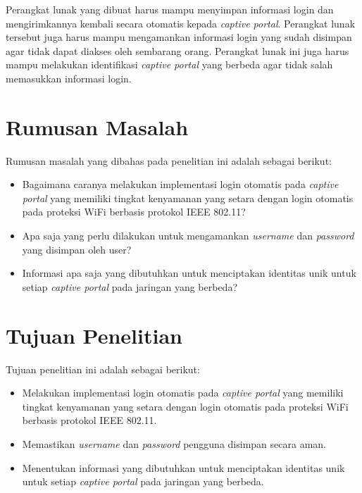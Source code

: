 Perangkat lunak yang dibuat harus mampu menyimpan informasi login dan mengirimkannya kembali secara otomatis kepada \textit{captive portal}. Perangkat lunak tersebut juga harus mampu mengamankan informasi login yang sudah disimpan agar tidak dapat diakses oleh sembarang orang. Perangkat lunak ini juga harus mampu melakukan identifikasi \textit{captive portal} yang berbeda agar tidak salah memasukkan informasi login.



\section{Rumusan Masalah}
\label{sec:rumusan_masalah}

Rumusan masalah yang dibahas pada penelitian ini adalah sebagai berikut:

\begin{itemize}
	\item{Bagaimana caranya melakukan implementasi login otomatis pada \textit{captive portal} yang memiliki tingkat kenyamanan yang setara dengan login otomatis pada proteksi WiFi berbasis protokol IEEE 802.11?}
	\item{Apa saja yang perlu dilakukan untuk mengamankan \textit{username} dan \textit{password} yang disimpan oleh user?}
	\item{Informasi apa saja yang dibutuhkan untuk menciptakan identitas unik untuk setiap \textit{captive portal} pada jaringan yang berbeda?}
\end{itemize}



\section{Tujuan Penelitian}
\label{sec:tujuan_penelitian}

Tujuan penelitian ini adalah sebagai berikut:

\begin{itemize}
	\item{Melakukan implementasi login otomatis pada \textit{captive portal} yang memiliki tingkat kenyamanan yang setara dengan login otomatis pada proteksi WiFi berbasis protokol IEEE 802.11.}
	\item{Memastikan \textit{username} dan \textit{password} pengguna disimpan secara aman.}
	\item{Menentukan informasi yang dibutuhkan untuk menciptakan identitas unik untuk setiap \textit{captive portal} pada jaringan yang berbeda.}
\end{itemize}



